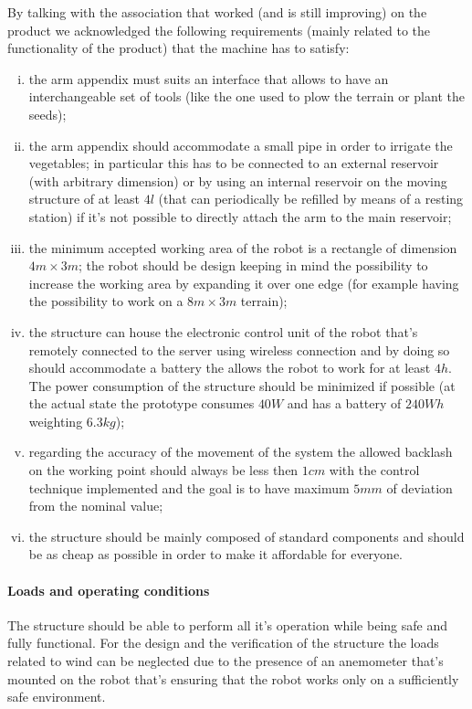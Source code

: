 	By talking with the association that worked (and is still improving) on the product we acknowledged the following requirements (mainly related to the functionality of the product) that the machine has to satisfy:
	\begin{enumerate}[i)]
		\item the arm appendix must suits an interface that allows to have an interchangeable set of tools (like the one used to plow the terrain or plant the seeds);
		
		\item the arm appendix should accommodate a small pipe in order to irrigate the vegetables; in particular this has to be connected to an external reservoir (with arbitrary dimension) or by using an internal reservoir on the moving structure of at least $4l$ (that can periodically be refilled by means of a resting station) if it's not possible to directly attach the arm to the main reservoir;
		
		\item the minimum accepted working area of the robot is a rectangle of dimension $4m\times 3m$; the robot should be design keeping in mind the possibility to increase the working area by expanding it over one edge (for example having the possibility to work on a $8m\times 3m$ terrain);
		
		\item the structure can house the electronic control unit of the robot that's remotely connected to the server using wireless connection and by doing so should accommodate a battery the allows the robot to work for at least $4h$. The power consumption of the structure should be minimized if possible (at the actual state the prototype consumes $40W$ and has a battery of $240 Wh$ weighting $6.3kg$);
		
		\item regarding the accuracy of the movement of the system the allowed backlash on the working point should always be less then $1cm$ with the control technique implemented and the goal is to have maximum $5mm$ of deviation from the nominal value;
		
		\item the structure should be mainly composed of standard components and should be as cheap as possible in order to make it affordable for everyone.
	\end{enumerate}

	\paragraph{Loads and operating conditions} The structure should be able to perform all it's operation while being safe and fully functional. For the design and the verification of the structure the loads related to wind can be neglected due to the presence of an anemometer that's mounted on the robot that's ensuring that the robot works only on a sufficiently safe environment.
	
